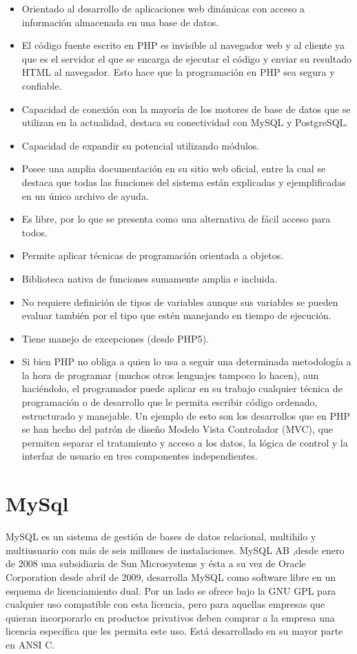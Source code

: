 \begin{itemize}
\item Orientado al desarrollo de aplicaciones web dinámicas con acceso a información almacenada en una base de datos.
\item El código fuente escrito en PHP es invisible al navegador web y al cliente ya que es el servidor el que se encarga de ejecutar el código y enviar su resultado HTML al navegador. Esto hace que la programación en PHP sea segura y confiable.
\item Capacidad de conexión con la mayoría de los motores de base de datos que se utilizan en la actualidad, destaca su conectividad con MySQL y PostgreSQL.
\item Capacidad de expandir su potencial utilizando módulos.
\item Posee una amplia documentación en su sitio web oficial, entre la cual se destaca que todas las funciones del sistema están explicadas y ejemplificadas en un único archivo de ayuda.
\item Es libre, por lo que se presenta como una alternativa de fácil acceso para todos.
\item Permite aplicar técnicas de programación orientada a objetos.
\item Biblioteca nativa de funciones sumamente amplia e incluida.
\item No requiere definición de tipos de variables aunque sus variables se pueden evaluar también por el tipo que estén manejando en tiempo de ejecución.
\item Tiene manejo de excepciones (desde PHP5).
\item Si bien PHP no obliga a quien lo usa a seguir una determinada metodología a la hora de programar (muchos otros lenguajes tampoco lo hacen), aun haciéndolo, el programador puede aplicar en su trabajo cualquier técnica de programación o de desarrollo que le permita escribir código ordenado, estructurado y manejable. Un ejemplo de esto son los desarrollos que en PHP se han hecho del patrón de diseño Modelo Vista Controlador (MVC), que permiten separar el tratamiento y acceso a los datos, la lógica de control y la interfaz de usuario en tres componentes independientes.
\end{itemize}

\section{MySql}
MySQL es un sistema de gestión de bases de datos relacional, multihilo y multiusuario con más de seis millones de instalaciones. MySQL AB ,desde enero de 2008 una subsidiaria de Sun Microsystems y ésta a su vez de Oracle Corporation desde abril de 2009, desarrolla MySQL como software libre en un esquema de licenciamiento dual.
Por un lado se ofrece bajo la GNU GPL para cualquier uso compatible con esta licencia, pero para aquellas empresas que quieran incorporarlo en productos privativos deben comprar a la empresa una licencia específica que les permita este uso. Está desarrollado en su mayor parte en ANSI C.\\


